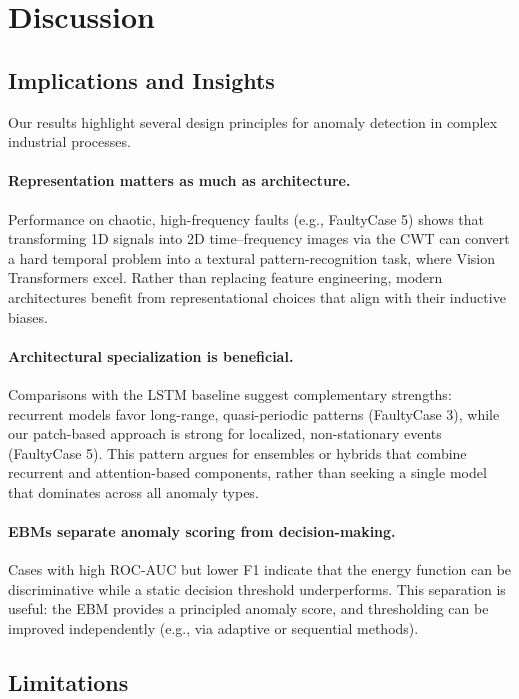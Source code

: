 \documentclass{article}
\begin{document}
\section{Discussion}\label{sec:discussion}

\subsection{Implications and Insights}

Our results highlight several design principles for anomaly detection in complex industrial processes.

\paragraph{Representation matters as much as architecture.}
Performance on chaotic, high-frequency faults (e.g., FaultyCase 5) shows that transforming 1D signals into 2D time–frequency images via the CWT can convert a hard temporal problem into a textural pattern-recognition task, where Vision Transformers excel. Rather than replacing feature engineering, modern architectures benefit from representational choices that align with their inductive biases.

\paragraph{Architectural specialization is beneficial.}
Comparisons with the LSTM baseline suggest complementary strengths: recurrent models favor long-range, quasi-periodic patterns (FaultyCase 3), while our patch-based approach is strong for localized, non-stationary events (FaultyCase 5). This pattern argues for ensembles or hybrids that combine recurrent and attention-based components, rather than seeking a single model that dominates across all anomaly types.

\paragraph{EBMs separate anomaly scoring from decision-making.}
Cases with high ROC-AUC but lower F1 indicate that the energy function can be discriminative while a static decision threshold underperforms. This separation is useful: the EBM provides a principled anomaly score, and thresholding can be improved independently (e.g., via adaptive or sequential methods).

\subsection{Limitations}
\end{document}
